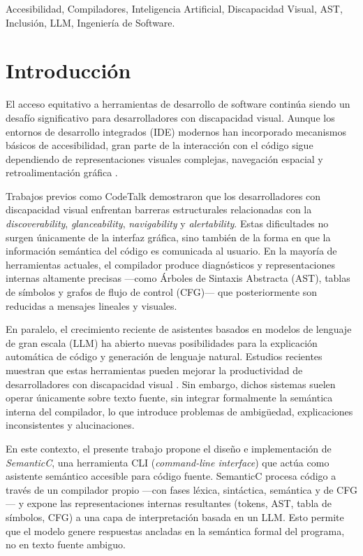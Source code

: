 \documentclass[conference]{IEEEtran}
\begin{document}
\begin{IEEEkeywords}
Accesibilidad, Compiladores, Inteligencia Artificial, Discapacidad Visual, AST, Inclusión, LLM, Ingeniería de Software.
\end{IEEEkeywords}

\section{Introducción}

El acceso equitativo a herramientas de desarrollo de software continúa siendo un desafío significativo para desarrolladores con discapacidad visual. Aunque los entornos de desarrollo integrados (IDE) modernos han incorporado mecanismos básicos de accesibilidad, gran parte de la interacción con el código sigue dependiendo de representaciones visuales complejas, navegación espacial y retroalimentación gráfica \cite{codetalk}.

Trabajos previos como CodeTalk \cite{codetalk} demostraron que los desarrolladores con discapacidad visual enfrentan barreras estructurales relacionadas con la \textit{discoverability}, \textit{glanceability}, \textit{navigability} y \textit{alertability}. Estas dificultades no surgen únicamente de la interfaz gráfica, sino también de la forma en que la información semántica del código es comunicada al usuario. En la mayoría de herramientas actuales, el compilador produce diagnósticos y representaciones internas altamente precisas —como Árboles de Sintaxis Abstracta (AST), tablas de símbolos y grafos de flujo de control (CFG)— que posteriormente son reducidas a mensajes lineales y visuales.

En paralelo, el crecimiento reciente de asistentes basados en modelos de lenguaje de gran escala (LLM) ha abierto nuevas posibilidades para la explicación automática de código y generación de lenguaje natural. Estudios recientes muestran que estas herramientas pueden mejorar la productividad de desarrolladores con discapacidad visual \cite{genai_accessibility}. Sin embargo, dichos sistemas suelen operar únicamente sobre texto fuente, sin integrar formalmente la semántica interna del compilador, lo que introduce problemas de ambigüedad, explicaciones inconsistentes y alucinaciones.

En este contexto, el presente trabajo propone el diseño e implementación de \textit{SemanticC}, una herramienta CLI (\textit{command-line interface}) que actúa como asistente semántico accesible para código fuente. SemanticC procesa código a través de un compilador propio —con fases léxica, sintáctica, semántica y de CFG— y expone las representaciones internas resultantes (tokens, AST, tabla de símbolos, CFG) a una capa de interpretación basada en un LLM. Esto permite que el modelo genere respuestas ancladas en la semántica formal del programa, no en texto fuente ambiguo.
\end{document}
